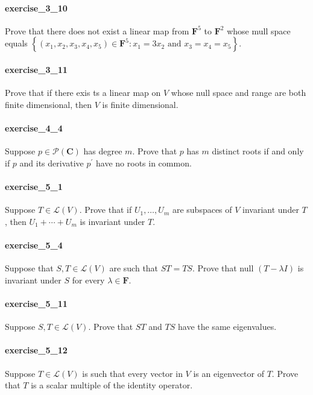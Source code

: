 \documentclass{article}
\begin{document}
\paragraph{exercise\_3\_10} Prove that there does not exist a linear map from $\mathbf{F}^{5}$ to $\mathbf{F}^{2}$ whose mull space equals $\left\{\left(x_{1}, x_{2}, x_{3}, x_{4}, x_{5}\right) \in \mathbf{F}^{5}: x_{1}=3 x_{2} \text { and } x_{3}=x_{4}=x_{5}\right\} .$

\paragraph{exercise\_3\_11} Prove that if there exis ts a linear map on $V$ whose null space and range are both finite dimensional, then $V$ is finite dimensional.

\paragraph{exercise\_4\_4} Suppose $p \in \mathcal{P}(\mathbf{C})$ has degree $m$. Prove that $p$ has $m$ distinct roots if and only if $p$ and its derivative $p^{\prime}$ have no roots in common.

\paragraph{exercise\_5\_1} Suppose $T \in \mathcal{L}(V)$. Prove that if $U_{1}, \ldots, U_{m}$ are subspaces of $V$ invariant under $T$, then $U_{1}+\cdots+U_{m}$ is invariant under $T$.

\paragraph{exercise\_5\_4} Suppose that $S, T \in \mathcal{L}(V)$ are such that $S T=T S$. Prove that null $(T-\lambda I)$ is invariant under $S$ for every $\lambda \in \mathbf{F}$.

\paragraph{exercise\_5\_11} Suppose $S, T \in \mathcal{L}(V)$. Prove that $S T$ and $T S$ have the same eigenvalues.

\paragraph{exercise\_5\_12} Suppose $T \in \mathcal{L}(V)$ is such that every vector in $V$ is an eigenvector of $T$. Prove that $T$ is a scalar multiple of the identity operator.
\end{document}
